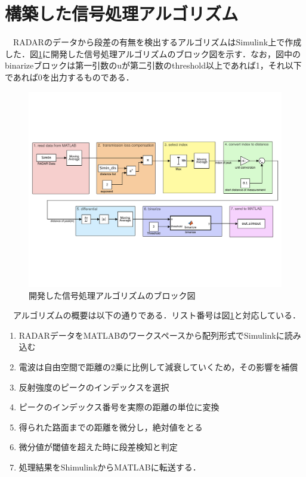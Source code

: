 \section{構築した信号処理アルゴリズム}
　RADARのデータから段差の有無を検出するアルゴリズムはSimulink上で作成した．図\ref{fig:System_Block_Color}に開発した信号処理アルゴリズムのブロック図を示す．なお，図中のbinarizeブロックは第一引数のuが第二引数のthreshold以上であれば1，それ以下であれば0を出力するものである．
\begin{figure}[H]
    \centering
    \includegraphics[width=13cm]{./fig/System_Block_Color.pdf}
    \caption{開発した信号処理アルゴリズムのブロック図}
    \label{fig:System_Block_Color}
\end{figure}

　アルゴリズムの概要は以下の通りである．リスト番号は図\ref{fig:System_Block_Color}と対応している．
\begin{enumerate}
    \item RADARデータをMATLABのワークスペースから配列形式でSimulinkに読み込む
    \item 電波は自由空間で距離の2乗に比例して減衰していくため，その影響を補償
    \item 反射強度のピークのインデックスを選択
    \item ピークのインデックス番号を実際の距離の単位に変換
    \item 得られた路面までの距離を微分し，絶対値をとる
    \item 微分値が閾値を超えた時に段差検知と判定
    \item 処理結果をShimulinkからMATLABに転送する．
\end{enumerate}

